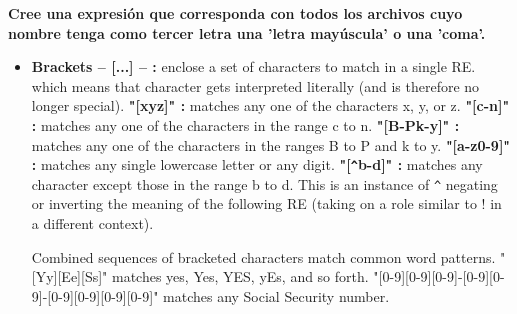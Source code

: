 \documentclass[a4paper,11pt,spanish]{article} %
\begin{document}
\textbf{Cree una expresión que corresponda con todos los archivos cuyo nombre 
tenga como tercer letra una 'letra mayúscula' o una 'coma'.}

\begin{itemize}
 \item \textbf{Brackets -- [...] -- :} enclose a set of characters to match in a single RE.
 which means that character gets interpreted literally (and is therefore no longer special).
  \subitem \textbf{"[xyz]" :} matches any one of the characters x, y, or z.
  \subitem \textbf{"[c-n]" :} matches any one of the characters in the range c to n.
  \subitem \textbf{"[B-Pk-y]" :} matches any one of the characters in the ranges B to P and k to y.
  \subitem \textbf{"[a-z0-9]" :} matches any single lowercase letter or any digit.
  \subitem \textbf{"[\texttt{\^}b-d]" :} matches any character except those in the range b to d.
  This is an instance of \texttt{\^} negating or inverting the meaning of the following RE (taking on a
  role similar to ! in a different context).
 
 Combined sequences of bracketed characters match common word patterns. "[Yy][Ee][Ss]" 
 matches yes, Yes, YES, yEs, and so forth. "[0-9][0-9][0-9]-[0-9][0-9]-[0-9][0-9][0-9][0-9]" 
 matches any Social Security number.
 \end{itemize}

\cite{tldpre}
\end{document}
